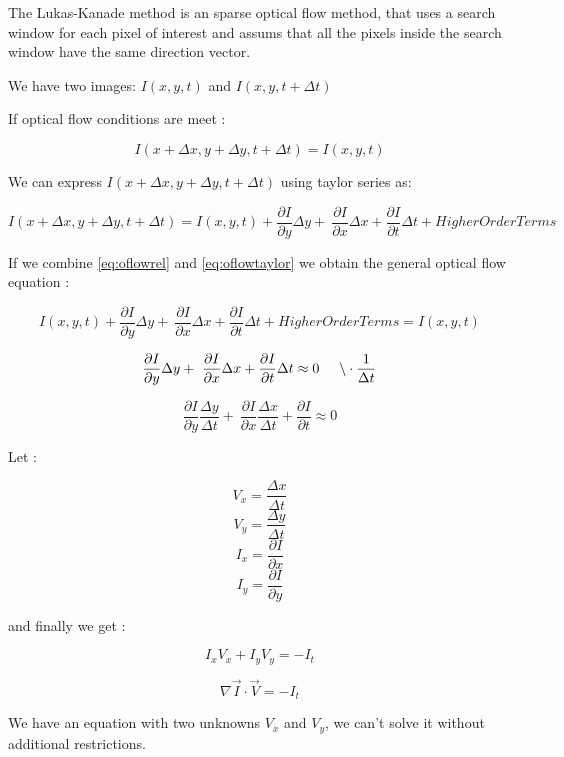 The Lukas-Kanade method is an sparse optical flow method, that 
uses a search window for each pixel of interest and assums that all the pixels 
inside the search window have the same direction vector.


We have two images: $I(x,y,t)$ and $I(x,y,t+\Delta t)$ 

If optical flow conditions are meet :

\begin{equation}
\label{eq:oflowrel}
I(x + \Delta x,y + \Delta y, t + \Delta t) = I(x,y,t)
\end{equation}

We can express $I(x + \Delta x, y + \Delta y, t + \Delta t)$ using taylor series as:

\begin{equation}
\label{eq:oflowtaylor}
I(x + \Delta x, y + \Delta y, t + \Delta t) = I(x,y,t) + \frac{\partial I}{\partial y} \Delta y + \
 \frac{\partial I}{\partial x} \Delta x  + \frac{\partial I}{\partial t} \Delta t + Higher Order Terms 
\end{equation}

If we combine \ref{eq:oflowrel} and \ref{eq:oflowtaylor} we obtain the general optical flow equation :


$$ I(x,y,t) + \frac{\partial I}{\partial y} \Delta y + \
 \frac{\partial I}{\partial x} \Delta x  + \frac{\partial I}{\partial t} \Delta t + Higher Order Terms = I(x,y,t) $$


$$ \frac{\partial I}{\partial y} \Delta y + \
 \frac{\partial I}{\partial x} \Delta x  + \frac{\partial I}{\partial t} \Delta t \approx 0 \hspace{0.5cm} \backslash \cdot \frac{1}{\Delta t} $$


$$ \frac{\partial I}{\partial y} \frac{\Delta y}{\Delta t} + \
 \frac{\partial I}{\partial x} \frac{\Delta x}{\Delta t}  + \frac{\partial I}{\partial t}  \approx 0 $$


Let :

$$ V_x = \frac{\Delta x}{\Delta t} $$
$$ V_y = \frac{\Delta y}{\Delta t} $$
$$ I_x = \frac{\partial I}{\partial x}$$
$$ I_y = \frac{\partial I}{\partial y}$$

and finally we get :

$$ I_x V_x + I_y V_y = -I_t $$

\begin{equation}
\label{eq:oflowgeneral}
\nabla{\vec{I}} \cdot \vec{V} = -I_t
\end{equation}

We have an equation with two unknowns $V_x$ and $V_y$, we can't solve it without additional restrictions.

